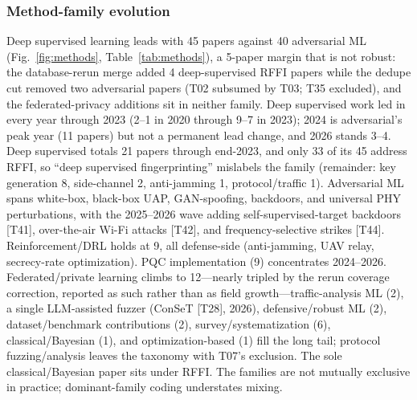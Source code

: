 \subsubsection{Method-family evolution}
Deep supervised learning leads with 45 papers against 40 adversarial ML (Fig.~\ref{fig:methods}, Table~\ref{tab:methods}), a 5-paper margin that is not robust: the database-rerun merge added 4 deep-supervised RFFI papers while the dedupe cut removed two adversarial papers (T02 subsumed by T03; T35 excluded), and the federated-privacy additions sit in neither family. Deep supervised work led in every year through 2023 (2--1 in 2020 through 9--7 in 2023); 2024 is adversarial's peak year (11 papers) but not a permanent lead change, and 2026 stands 3--4. Deep supervised totals 21 papers through end-2023, and only 33 of its 45 address RFFI, so ``deep supervised fingerprinting'' mislabels the family (remainder: key generation 8, side-channel 2, anti-jamming 1, protocol/traffic 1). Adversarial ML spans white-box, black-box UAP, GAN-spoofing, backdoors, and universal PHY perturbations, with the 2025--2026 wave adding self-supervised-target backdoors [T41], over-the-air Wi-Fi attacks [T42], and frequency-selective strikes [T44]. Reinforcement/DRL holds at 9, all defense-side (anti-jamming, UAV relay, secrecy-rate optimization). PQC implementation (9) concentrates 2024--2026. Federated/private learning climbs to 12---nearly tripled by the rerun coverage correction, reported as such rather than as field growth---traffic-analysis ML (2), a single LLM-assisted fuzzer (ConSeT [T28], 2026), defensive/robust ML (2), dataset/benchmark contributions (2), survey/systematization (6), classical/Bayesian (1), and optimization-based (1) fill the long tail; protocol fuzzing/analysis leaves the taxonomy with T07's exclusion. The sole classical/Bayesian paper sits under RFFI. The families are not mutually exclusive in practice; dominant-family coding understates mixing.


